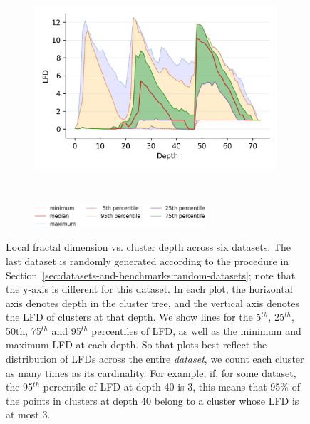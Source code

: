\begin{figure}
\begin{subfigure}[b]{0.5\textwidth}
        \label{fig:results:silva-lfd}
    \end{subfigure}%
    \begin{subfigure}[b]{0.5\textwidth}
        \includegraphics[width=0.99\textwidth]{images/lfd/radio-ml.png}\\
        \label{fig:results:radioml-lfd}
    \end{subfigure}%
    \\
    \vskip -0.1in
    \begin{subfigure}[b]{0.94\textwidth}
        \centering
        \includegraphics[width=0.7\textwidth]{images/lfd/legend.png}
        \label{fig:results:lfd-legend}
    \end{subfigure}%
    \vskip -0.1in
    \caption{Local fractal dimension vs. cluster depth across six datasets. The last dataset is randomly generated according to the procedure in Section~\ref{sec:datasets-and-benchmarks:random-datasets}; note that the y-axis is different for this dataset. In each plot, the horizontal axis denotes depth in the cluster tree, and the vertical axis denotes the LFD of clusters at that depth. We show lines for the 5$^{th}$, 25$^{th}$, 50th, 75$^{th}$ and 95$^{th}$ percentiles of LFD, as well as the minimum and maximum LFD at each depth. So that plots best reflect the distribution of LFDs across the entire \textit{dataset}, we count each cluster as many times as its cardinality. For example, if, for some dataset, the 95$^{th}$ percentile of LFD at depth 40 is 3, this means that 95\% of the points in clusters at depth 40 belong to a cluster whose LFD is at most 3.}
    \label{fig:results:lfd-plots}
    \vskip -0.4in
\end{figure}


